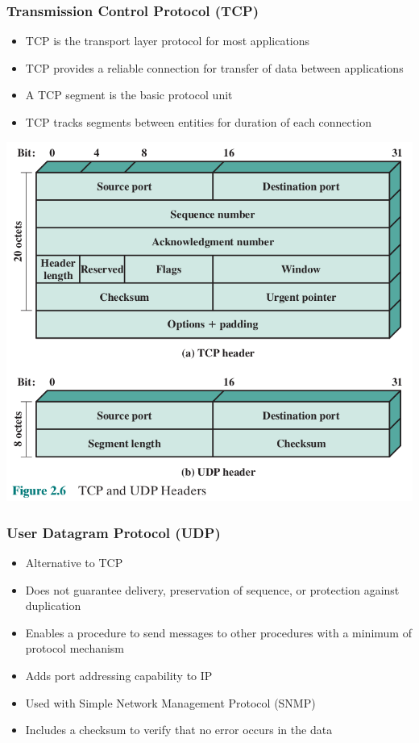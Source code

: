 \documentclass[pdflatex,compress]{beamer}
\begin{document}
\begin{frame}
	\frametitle{Transmission Control Protocol (TCP)}
	\begin{itemize}
		\item TCP is the transport layer protocol for most applications
		\item TCP provides a reliable connection for transfer of data between applications
		\item A TCP segment is the basic protocol unit
		\item TCP tracks segments between entities for duration of each connection
	\end{itemize}
\end{frame}

\begin{frame}
	\begin{center}
		\includegraphics[height=0.9\textheight]{img/img06}
	\end{center}
\end{frame}

\begin{frame}
	\frametitle{User Datagram Protocol (UDP)}
	\begin{itemize}
		\item Alternative to TCP
		\item Does not guarantee delivery, preservation of sequence, or protection against duplication
		\item Enables a procedure to send messages to other procedures with a minimum of protocol mechanism
		\item Adds port addressing capability to IP
		\item Used with Simple Network Management Protocol (SNMP)
		\item Includes a checksum to verify that no error occurs in the data
	\end{itemize}
\end{frame}
\end{document}
